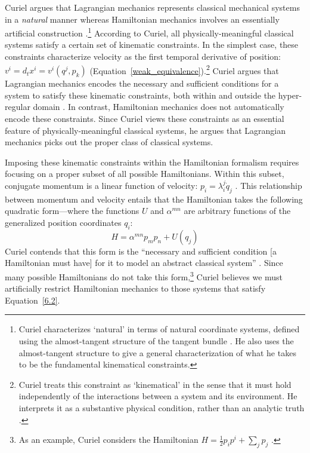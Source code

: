 \documentclass[12pt, english, twoside]{article} %
\begin{document}

Curiel argues that Lagrangian mechanics represents classical mechanical systems in a \textit{natural} manner whereas Hamiltonian mechanics involves an essentially artificial construction \parencites*[270]{Curiel}.\footnote{Curiel characterizes `natural' in terms of natural coordinate systems, defined using the almost-tangent structure of the tangent bundle \parencites*[290-291]{Curiel}. He also uses the almost-tangent structure to give a general characterization of what he takes to be the fundamental kinematical constraints.} According to Curiel, all physically-meaningful classical systems satisfy a certain set of kinematic constraints. In the simplest case, these constraints characterize velocity as the first temporal derivative of position: $v^i = d_t x^i = v^i(q^j, p_k)$ (Equation~\ref{weak_equivalence}).\footnote{Curiel treats this constraint as `kinematical' in the sense that it must hold independently of the interactions between a system and its environment. He interprets it as a substantive physical condition, rather than an analytic truth \parencites*[282]{Curiel}.} Curiel argues that Lagrangian mechanics encodes the necessary and sufficient conditions for a system to satisfy these kinematic constraints, both within and outside the hyper-regular domain \parencites*[307--308, 311]{Curiel}. In contrast, Hamiltonian mechanics does not automatically encode these constraints. Since Curiel views these constraints as an essential feature of physically-meaningful classical systems, he argues that Lagrangian mechanics picks out the proper class of classical systems. 

Imposing these kinematic constraints within the Hamiltonian formalism requires focusing on a proper subset of all possible Hamiltonians. Within this subset, conjugate momentum is a linear function of velocity: $p_i = \lambda^j_i \dot{q}_j $ \parencites*[304]{Curiel}. This relationship between momentum and velocity entails that the Hamiltonian takes the following quadratic form---where the functions $U$ and $\alpha^{m n}$ are arbitrary functions of the generalized position coordinates $q_i$:
\begin{equation} \label{6.2}
H =\alpha^{m n} p_m p_n + U (q_j) 
\end{equation}
Curiel contends that this form is the ``necessary and sufficient condition [a Hamiltonian must have] for it to model an abstract classical system'' \parencites*[305]{Curiel}. Since many possible Hamiltonians do not take this form,\footnote{As an example, Curiel considers the Hamiltonian $H = \frac{1}{2} p_i p^i + \sum_j p_j$  \parencites*[305]{Curiel}.} Curiel believes we must artificially restrict Hamiltonian mechanics to those systems that satisfy Equation~\ref{6.2}.
\end{document}
